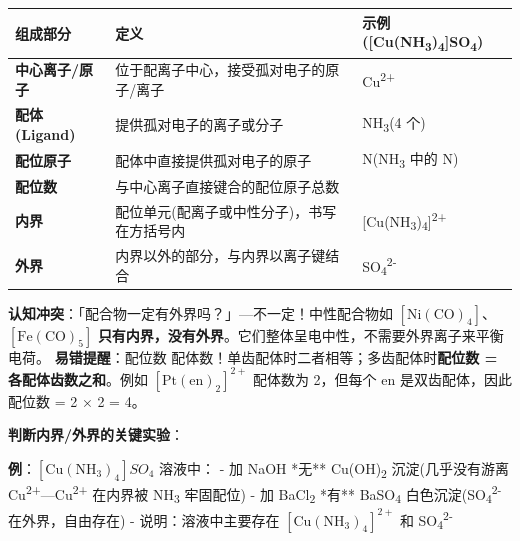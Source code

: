 {\def\LTcaptype{none} %
\begin{longtable}[]{@{}
  >{\raggedright\arraybackslash}p{}
  >{\raggedright\arraybackslash}p{}
  >{\raggedright\arraybackslash}p{}@{}}
\toprule\noalign{}
\begin{minipage}[b]{\linewidth}\raggedright
组成部分
\end{minipage} & \begin{minipage}[b]{\linewidth}\raggedright
定义
\end{minipage} & \begin{minipage}[b]{\linewidth}\raggedright
示例({[}Cu(NH\textsubscript{3})\textsubscript{4}{]}SO\textsubscript{4})
\end{minipage} \\
\midrule\noalign{}
\endhead
\bottomrule\noalign{}
\endlastfoot
\textbf{中心离子/原子} & 位于配离子中心，接受孤对电子的原子/离子 & Cu\textsuperscript{2+} \\
\textbf{配体 (Ligand)} & 提供孤对电子的离子或分子 & NH\textsubscript{3}(4 个) \\
\textbf{配位原子} & 配体中直接提供孤对电子的原子 & N(NH\textsubscript{3} 中的 N) \\
\textbf{配位数} & 与中心离子直接键合的配位原子总数 & 4 \\
\textbf{内界} & 配位单元(配离子或中性分子)，书写在方括号内 & {[}Cu(NH\textsubscript{3})\textsubscript{4}{]}\textsuperscript{2+} \\
\textbf{外界} & 内界以外的部分，与内界以离子键结合 & SO\textsubscript{4}\textsuperscript{2-} \\
\end{longtable}
}

\textbf{认知冲突}：「配合物一定有外界吗？」---不一定！中性配合物如 \([\mathrm{Ni(CO)_4}]\)、\([\mathrm{Fe(CO)_5}]\) \textbf{只有内界，没有外界}。它们整体呈电中性，不需要外界离子来平衡电荷。
\textbf{易错提醒}：配位数  配体数！单齿配体时二者相等；多齿配体时\textbf{配位数 = 各配体齿数之和}。例如 \([\mathrm{Pt(en)_2}]^{2+}\) 配体数为 2，但每个 en 是双齿配体，因此配位数 = 2 × 2 = 4。

\textbf{判断内界/外界的关键实验}：

\textbf{例}：\([\mathrm{Cu(NH_3)_4}]SO_4\) 溶液中：
- 加 NaOH \箭 **无** Cu(OH)\textsubscript{2} 沉淀(几乎没有游离 Cu\textsuperscript{2+}---Cu\textsuperscript{2+} 在内界被 NH\textsubscript{3} 牢固配位)
- 加 BaCl\textsubscript{2} \箭 **有** BaSO\textsubscript{4} 白色沉淀(SO\textsubscript{4}\textsuperscript{2-} 在外界，自由存在)
- 说明：溶液中主要存在 \([\mathrm{Cu(NH_3)_4}]^{2+}\) 和 SO\textsubscript{4}\textsuperscript{2-}

